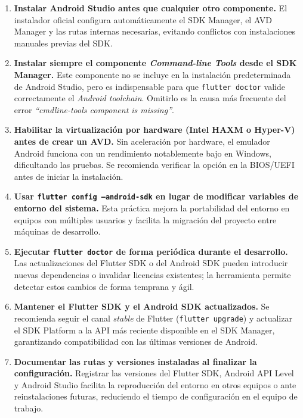 \documentclass[12pt,a4paper]{article}
\begin{document}
\begin{enumerate}
  \item \textbf{Instalar Android Studio antes que cualquier otro componente.} El instalador oficial configura automáticamente el SDK Manager, el AVD Manager y las rutas internas necesarias, evitando conflictos con instalaciones manuales previas del SDK.

  \item \textbf{Instalar siempre el componente \textit{Command-line Tools} desde el SDK Manager.} Este componente no se incluye en la instalación predeterminada de Android Studio, pero es indispensable para que \texttt{flutter doctor} valide correctamente el \textit{Android toolchain}. Omitirlo es la causa más frecuente del error \textit{``cmdline-tools component is missing''}.

  \item \textbf{Habilitar la virtualización por hardware (Intel HAXM o Hyper-V) antes de crear un AVD.} Sin aceleración por hardware, el emulador Android funciona con un rendimiento notablemente bajo en Windows, dificultando las pruebas. Se recomienda verificar la opción en la BIOS/UEFI antes de iniciar la instalación.

  \item \textbf{Usar \texttt{flutter config --android-sdk} en lugar de modificar variables de entorno del sistema.} Esta práctica mejora la portabilidad del entorno en equipos con múltiples usuarios y facilita la migración del proyecto entre máquinas de desarrollo.

  \item \textbf{Ejecutar \texttt{flutter doctor} de forma periódica durante el desarrollo.} Las actualizaciones del Flutter SDK o del Android SDK pueden introducir nuevas dependencias o invalidar licencias existentes; la herramienta permite detectar estos cambios de forma temprana y ágil.

  \item \textbf{Mantener el Flutter SDK y el Android SDK actualizados.} Se recomienda seguir el canal \textit{stable} de Flutter (\texttt{flutter upgrade}) y actualizar el SDK Platform a la API más reciente disponible en el SDK Manager, garantizando compatibilidad con las últimas versiones de Android.

  \item \textbf{Documentar las rutas y versiones instaladas al finalizar la configuración.} Registrar las versiones del Flutter SDK, Android API Level y Android Studio facilita la reproducción del entorno en otros equipos o ante reinstalaciones futuras, reduciendo el tiempo de configuración en el equipo de trabajo.
\end{enumerate}
\end{document}
